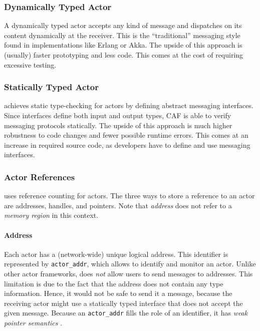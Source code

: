 \subsubsection{Dynamically Typed Actor}

A dynamically typed actor accepts any kind of message and dispatches on its content dynamically at the receiver.
This is the ``traditional'' messaging style found in implementations like Erlang or Akka.
The upside of this approach is (usually) faster prototyping and less code.
This comes at the cost of requiring excessive testing.

\subsubsection{Statically Typed Actor}

\lib achieves static type-checking for actors by defining abstract messaging interfaces.
Since interfaces define both input and output types, CAF is able to verify messaging protocols statically.
The upside of this approach is much higher robustness to code changes and fewer possible runtime errors.
This comes at an increase in required source code, as developers have to define and use messaging interfaces.

\subsubsection{Actor References}
\label{actor-references}

\lib uses reference counting for actors. The three ways to store a reference to an actor are addresses, handles, and pointers. Note that \emph{address} does not refer to a \emph{memory region} in this context.

\paragraph{Address}
\label{actor-address}

Each actor has a (network-wide) unique logical address. This identifier is represented by \lstinline^actor_addr^, which allows to identify and monitor an actor.
Unlike other actor frameworks, \lib does \emph{not} allow users to send messages to addresses.
This limitation is due to the fact that the address does not contain any type information.
Hence, it would not be safe to send it a message, because the receiving actor might use a statically typed interface that does not accept the given message. Because an \lstinline^actor_addr^ fills the role of an identifier, it has \emph{weak pointer semantics} .

